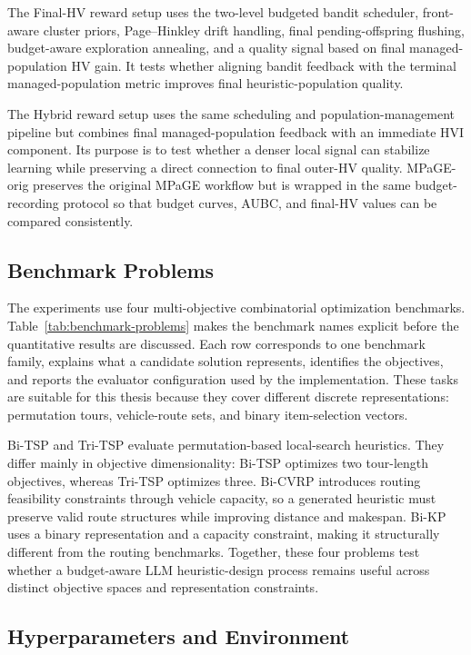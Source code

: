 The Final-HV reward setup uses the two-level budgeted bandit scheduler, front-aware cluster priors, Page--Hinkley drift handling, final pending-offspring flushing, budget-aware exploration annealing, and a quality signal based on final managed-population HV gain. It tests whether aligning bandit feedback with the terminal managed-population metric improves final heuristic-population quality.

The Hybrid reward setup uses the same scheduling and population-management pipeline but combines final managed-population feedback with an immediate HVI component. Its purpose is to test whether a denser local signal can stabilize learning while preserving a direct connection to final outer-HV quality. MPaGE-orig preserves the original MPaGE workflow but is wrapped in the same budget-recording protocol so that budget curves, AUBC, and final-HV values can be compared consistently.

\subsection{Benchmark Problems}

The experiments use four multi-objective combinatorial optimization benchmarks. Table~\ref{tab:benchmark-problems} makes the benchmark names explicit before the quantitative results are discussed. Each row corresponds to one benchmark family, explains what a candidate solution represents, identifies the objectives, and reports the evaluator configuration used by the implementation. These tasks are suitable for this thesis because they cover different discrete representations: permutation tours, vehicle-route sets, and binary item-selection vectors.



Bi-TSP and Tri-TSP evaluate permutation-based local-search heuristics. They differ mainly in objective dimensionality: Bi-TSP optimizes two tour-length objectives, whereas Tri-TSP optimizes three. Bi-CVRP introduces routing feasibility constraints through vehicle capacity, so a generated heuristic must preserve valid route structures while improving distance and makespan. Bi-KP uses a binary representation and a capacity constraint, making it structurally different from the routing benchmarks. Together, these four problems test whether a budget-aware LLM heuristic-design process remains useful across distinct objective spaces and representation constraints.

\subsection{Hyperparameters and Environment}

